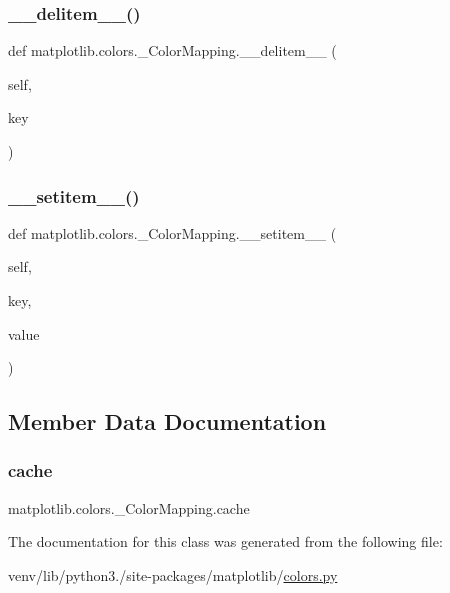 \subsubsection{\texorpdfstring{\+\_\+\+\_\+delitem\+\_\+\+\_\+()}{\_\_delitem\_\_()}}
{\footnotesize\ttfamily def matplotlib.\+colors.\+\_\+\+Color\+Mapping.\+\_\+\+\_\+delitem\+\_\+\+\_\+ (\begin{DoxyParamCaption}\item[{}]{self,  }\item[{}]{key }\end{DoxyParamCaption})}

\mbox{\label{classmatplotlib_1_1colors_1_1__ColorMapping_abf379a6a848687b0dac6f6bd1691c637}} 
\subsubsection{\texorpdfstring{\+\_\+\+\_\+setitem\+\_\+\+\_\+()}{\_\_setitem\_\_()}}
{\footnotesize\ttfamily def matplotlib.\+colors.\+\_\+\+Color\+Mapping.\+\_\+\+\_\+setitem\+\_\+\+\_\+ (\begin{DoxyParamCaption}\item[{}]{self,  }\item[{}]{key,  }\item[{}]{value }\end{DoxyParamCaption})}



\subsection{Member Data Documentation}
\mbox{\label{classmatplotlib_1_1colors_1_1__ColorMapping_a67f5773869f59dc4a87fdb4a7750beb7}} 
\subsubsection{\texorpdfstring{cache}{cache}}
{\footnotesize\ttfamily matplotlib.\+colors.\+\_\+\+Color\+Mapping.\+cache}



The documentation for this class was generated from the following file\+:\begin{DoxyCompactItemize}
\item 
venv/lib/python3./site-\/packages/matplotlib/\hyperlink{colors_8py}{colors.\+py}\end{DoxyCompactItemize}
